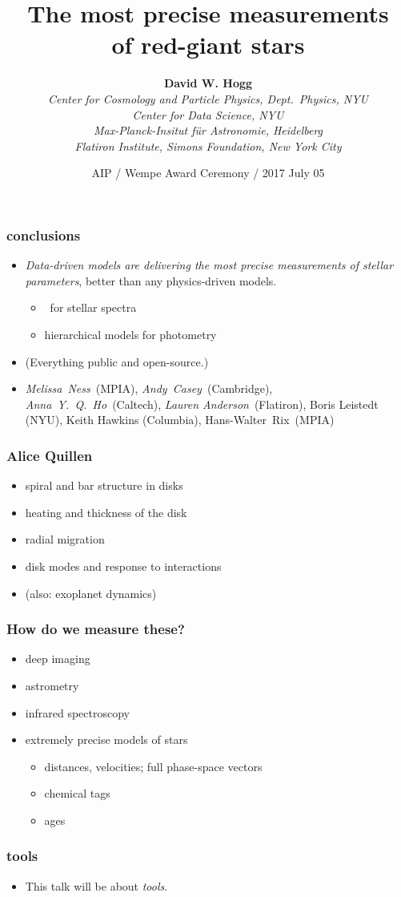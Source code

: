 \documentclass[pdftex]{beamer}
\title{The most precise measurements\\ of red-giant stars}
\author[David W. Hogg (NYU)]{\textbf{David W. Hogg} \\
  \textsl{\footnotesize Center for Cosmology and Particle Physics, Dept.~Physics, NYU} \\
  \textsl{\footnotesize Center for Data Science, NYU} \\
  \textsl{\footnotesize Max-Planck-Insitut f\"ur Astronomie, Heidelberg} \\
  \textsl{\footnotesize Flatiron Institute, Simons Foundation, New York City}}
\date{AIP / Wempe Award Ceremony / 2017 July 05}
\newcommand{\conclusions}{%
\begin{frame}
  \frametitle{conclusions}
  \begin{itemize}
  \item \emph{Data-driven models are delivering the most precise measurements
    of stellar parameters}, better than any physics-driven models.
    \begin{itemize}
    \item \tc\ for stellar spectra
    \item hierarchical models for photometry
    \end{itemize}
  \item (Everything public and open-source.)
  \item \emph{Melissa~Ness}~(MPIA), \emph{Andy~Casey}~(Cambridge), \emph{Anna~Y.~Q.~Ho}~(Caltech), \emph{Lauren Anderson}~(Flatiron), Boris Leistedt (NYU), Keith Hawkins (Columbia), Hans-Walter~Rix~(MPIA)
  \end{itemize}
\end{frame}}
\begin{document}
\sloppy\sloppypar\raggedright\raggedbottom

\begin{frame}
  \titlepage
\end{frame}

\conclusions

\begin{frame}
  \frametitle{Alice Quillen}
  \begin{itemize}
  \item spiral and bar structure in disks
  \item heating and thickness of the disk
  \item radial migration
  \item disk modes and response to interactions
  \item (also: exoplanet dynamics)
  \end{itemize}
\end{frame}

\begin{frame}
  \frametitle{How do we measure these?}
  \begin{itemize}
  \item deep imaging
  \item astrometry
  \item infrared spectroscopy
  \item extremely precise models of stars
    \begin{itemize}
    \item distances, velocities; full phase-space vectors
    \item chemical tags
    \item ages
    \end{itemize}
  \end{itemize}
\end{frame}

\begin{frame}
  \frametitle{tools}
  \begin{itemize}
  \item This talk will be about \emph{tools}.
  \end{itemize}
\end{frame}
\end{document}
